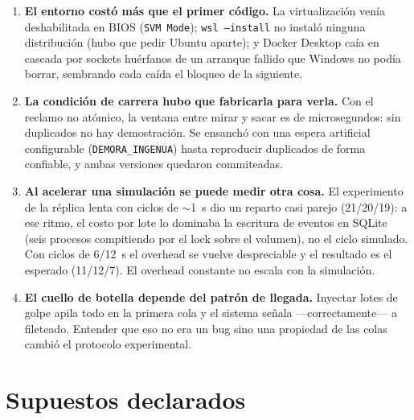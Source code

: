\documentclass[12pt,a4paper]{article}
\begin{document}
\begin{enumerate}[leftmargin=*]
  \item \textbf{El entorno costó más que el primer código.} La virtualización
        venía deshabilitada en BIOS (\texttt{SVM Mode}); \texttt{wsl --install}
        no instaló ninguna distribución (hubo que pedir Ubuntu aparte); y
        Docker Desktop caía en cascada por sockets huérfanos de un arranque
        fallido que Windows no podía borrar, sembrando cada caída el bloqueo
        de la siguiente.
  \item \textbf{La condición de carrera hubo que fabricarla para verla.} Con
        el reclamo no atómico, la ventana entre mirar y sacar es de
        microsegundos: sin duplicados no hay demostración. Se ensanchó con una
        espera artificial configurable (\texttt{DEMORA\_INGENUA}) hasta
        reproducir duplicados de forma confiable, y ambas versiones quedaron
        commiteadas.
  
  \item \textbf{Al acelerar una simulación se puede medir otra cosa.} El
        experimento de la réplica lenta con ciclos de $\sim$1~s dio un reparto
        casi parejo (21/20/19): a ese ritmo, el costo por lote lo dominaba la
        escritura de eventos en SQLite (seis procesos compitiendo por el lock
        sobre el volumen), no el ciclo simulado. Con ciclos de 6/12~s el
        overhead se vuelve despreciable y el resultado es el esperado
        (11/12/7). El overhead constante no escala con la simulación.
  \item \textbf{El cuello de botella depende del patrón de llegada.} Inyectar
        lotes de golpe apila todo en la primera cola y el sistema señala
        —correctamente— a fileteado. Entender que eso no era un bug sino una
        propiedad de las colas cambió el protocolo experimental.
\end{enumerate}

\section{Supuestos declarados}
\label{sec:supuestos}
\end{document}
